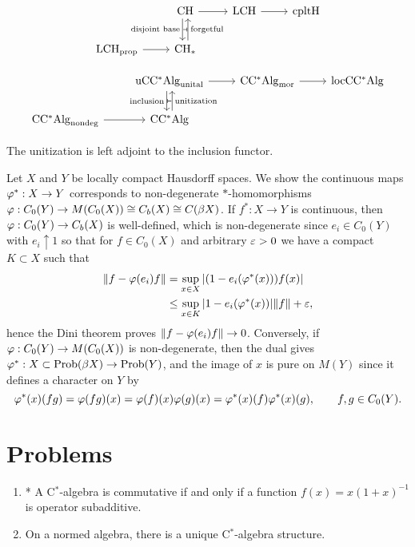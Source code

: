 \documentclass{../../large}
\begin{document}
\begin{prb}
\[\begin{tikzcd}
& \mathrm{CH} \rar\dar[shift right, swap]{\text{disjoint base}} &
\mathrm{LCH} \rar &
\mathrm{cpltH} \\
\mathrm{LCH}_{\mathrm{prop}} \rar &
\mathrm{CH}_* \uar[shift right,swap]{\text{forgetful}} \uar[phantom]{\scriptscriptstyle\boldsymbol{\dashv}}
\end{tikzcd}\]

\[\begin{tikzcd}
& \mathrm{uCC^*Alg}_{\mathrm{unital}} \rar\dar[shift right, swap]{\text{inclusion}} &
\mathrm{CC^*Alg}_{\mathrm{mor}} \rar &
\mathrm{locCC^*Alg} \\
\mathrm{CC^*Alg}_{\mathrm{nondeg}} \rar &
\mathrm{CC^*Alg} \uar[shift right,swap]{\text{unitization}} \uar[phantom]{\scriptscriptstyle\boldsymbol{\vdash}}
\end{tikzcd}\]

The unitization is left adjoint to the inclusion functor.
\end{prb}
\begin{pf}
Let $X$ and $Y$ be locally compact Hausdorff spaces.
We show the continuous maps $\varphi^*:X\to Y$ corresponds to non-degenerate $*$-homomorphisms $\varphi:C_0(Y)\to M(C_0(X))\cong C_b(X)\cong C(\beta X)$.
If $f^*:X\to Y$ is continuous, then $\varphi:C_0(Y)\to C_b(X)$ is well-defined, which is non-degenerate since $e_i\in C_0(Y)$ with $e_i\uparrow 1$ so that for $f\in C_0(X)$ and arbitrary $\varepsilon>0$ we have a compact $K\subset X$ such that
\begin{align*}
\|f-\varphi(e_i)f\|
&=\sup_{x\in X}|(1-e_i(\varphi^*(x)))f(x)|\\
&\le\sup_{x\in K}|1-e_i(\varphi^*(x))|\|f\|+\varepsilon,
\end{align*}
hence the Dini theorem proves $\|f-\varphi(e_i)f\|\to0$.
Conversely, if $\varphi:C_0(Y)\to M(C_0(X))$ is non-degenerate, then the dual gives $\varphi^*:X\subset\operatorname{Prob}(\beta X)\to\operatorname{Prob}(Y)$, and the image of $x$ is pure on $M(Y)$ since it defines a character on $Y$ by
\[\varphi^*(x)(fg)=\varphi(fg)(x)=\varphi(f)(x)\varphi(g)(x)=\varphi^*(x)(f)\varphi^*(x)(g),\qquad f,g\in C_0(Y).\]
\end{pf}


\section*{Problems}
\begin{enumerate}
\item* A C$^*$-algebra is commutative if and only if a function $f(x)=x(1+x)^{-1}$ is operator subadditive.
\item On a normed algebra, there is a unique C$^*$-algebra structure.
\end{enumerate}
\end{document}

